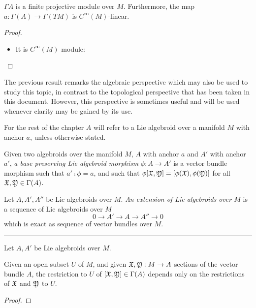 \begin{proposition}
$\Gamma A$ is a finite projective module over $M$. Furthermore, the map $a: \Gamma(A) \to \Gamma(TM)$ is $C^\infty(M)$-linear.
\end{proposition}
\begin{proof}
    \begin{itemize}
    \item It is $C^\infty(M)$ module:
    \end{itemize}
\end{proof}

The previous result remarks the algebraic perspective which may also be used to study this topic, in contrast to the topological perspective that has been taken in this document. However, this perspective is sometimes useful and will be used whenever clarity may be gained by its use.

For the rest of the chapter $A$ will refer to a Lie algebroid over a manifold $M$ with anchor $a$, unless otherwise stated.

\begin{definition}  
Given two algebroids over the manifold $M$, $A$ with anchor $a$ and $A'$ with anchor $a'$, \emph{a base preserving Lie algebroid morphism} $\phi: A \to A'$ is a vector bundle morphism such that $a' \comp \phi = a $, and such that $\phi[\mathfrak{X}, \mathfrak{Y}] = [\phi(\mathfrak{X}), \phi(\mathfrak{Y})]$ for all $\mathfrak{X}, \mathfrak{Y} \in \Gamma(A)$. 
\end{definition}

\begin{definition} 
Let $A, A', A''$ be Lie algebroids over $M$. \emph{An extension of Lie algebroids over $M$} is a sequence of Lie algebroids over $M$ \[ 0 \to A' \to A \to A'' \to 0 \] which is exact as sequence of vector bundles over $M$.
\end{definition}

\rule{10cm}{1mm}

\begin{definition}
Let $A, A'$ be Lie algebroids over $M$. 
\end{definition}

\begin{proposition}
Given an open subset $U$ of $M$, and given $\mathfrak{X}, \mathfrak{Y} : M \to A$ sections of the vector bundle $A$, the restriction to $U$ of $[\mathfrak{X}, \mathfrak{Y}] \in \Gamma(A)$ depends only on the restrictions of $\mathfrak{X}$ and $\mathfrak{Y}$ to $U$.
\end{proposition}
\begin{proof}

\end{proof}

